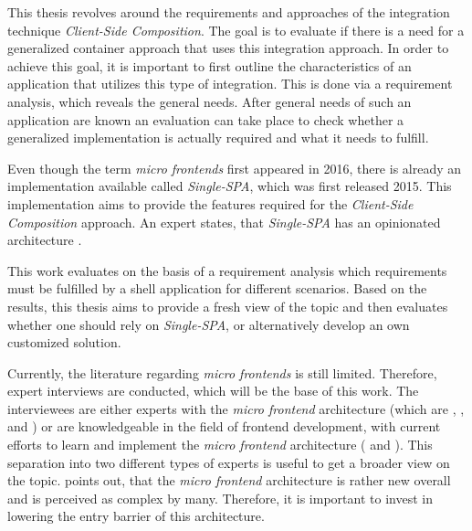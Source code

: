 This thesis revolves around the requirements and approaches of the integration technique \textit{Client-Side Composition}.
The goal is to evaluate if there is a need for a generalized container approach that uses this integration approach.
In order to achieve this goal, it is important to first outline the characteristics of an application that utilizes this type of integration.
This is done via a requirement analysis, which reveals the general needs.
After general needs of such an application are known an evaluation can take place to check whether a generalized implementation is actually required and what it needs to fulfill.



Even though the term \textit{micro frontends} first appeared in 2016, there is already an implementation available called \textit{Single-SPA}, which was first released 2015.
This implementation aims to provide the features required for the \textit{Client-Side Composition} approach.
An expert states, that \textit{Single-SPA} has an opinionated architecture \cite{Vogel.2020.Mezzalira}.

This work evaluates on the basis of a requirement analysis which requirements must be fulfilled by a shell application for different scenarios.
Based on the results, this thesis aims to provide a fresh view of the topic and then evaluates whether one should rely on \textit{Single-SPA}, or alternatively develop an own customized solution.



Currently, the literature regarding \textit{micro frontends} is still limited.
Therefore, expert interviews are conducted, which will be the base of this work.
The interviewees are either experts with the \textit{micro frontend} architecture (which are \textciteOlleck{}, \textciteMezzalira{}, \textciteSteyer{} and \textciteJovanovic{}) or are knowledgeable in the field of frontend development, with current efforts to learn and implement the \textit{micro frontend} architecture (\textciteRehm{} and \textciteHuber{}).
This separation into two different types of experts is useful to get a broader view on the topic.
\citeauthorJovanovic{} points out, that the \textit{micro frontend} architecture is rather new overall and is perceived as complex by many.
Therefore, it is important to invest in lowering the entry barrier of this architecture.

